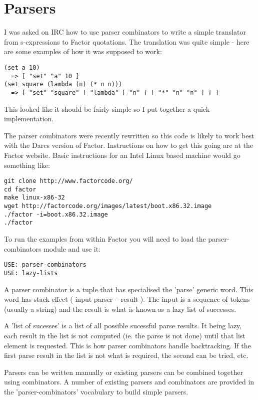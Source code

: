 \chapter{Parsers}\label{parsers}

I was asked on IRC how to use parser combinators to write a simple
translator from s-expressions to Factor quotations. The translation
was quite simple - here are some examples of how it was supposed to
work:

\begin{verbatim}
(set a 10) 
  => [ "set" "a" 10 ]
(set square (lambda (n) (* n n))) 
  => [ "set" "square" [ "lambda" [ "n" ] [ "*" "n" "n" ] ] ]
\end{verbatim}

This looked like it should be fairly simple so I put together a quick
implementation.

The parser combinators were recently rewritten so this code is likely
to work best with the Darcs version of Factor. Instructions on how to
get this going are at the Factor website. Basic instructions for an
Intel Linux based machine would go something like:

\begin{verbatim}
git clone http://www.factorcode.org/
cd factor
make linux-x86-32
wget http://factorcode.org/images/latest/boot.x86.32.image
./factor -i=boot.x86.32.image
./factor
\end{verbatim}

To run the examples from within Factor you will need to load the
parser-combinators module and use it:

\begin{verbatim}
USE: parser-combinators
USE: lazy-lists
\end{verbatim}

A parser combinator is a tuple that has specialised the 'parse'
 generic word. This word has stack effect ( input parser -- result
 ). The input is a sequence of tokens (usually a string) and the
 result is what is known as a lazy list of successes.

A 'list of sucesses' is a list of all possible sucessful parse
 results. It being lazy, each result in the list is not computed
 (ie. the parse is not done) until that list element is
 requested. This is how parser combinators handle backtracking. If the
 first parse result in the list is not what is required, the second
 can be tried, etc.

Parsers can be written manually or existing parsers can be combined
 together using combinators. A number of existing parsers and
 combinators are provided in the 'parser-combinators' vocabulary to
 build simple parsers.

